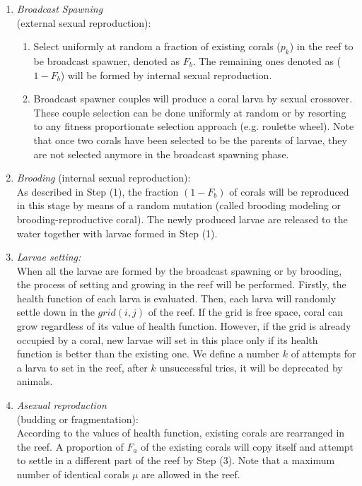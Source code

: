 \documentclass[11pt,twoside]{article}
\begin{document}
\begin{multicols}{2}
\begin{enumerate}
\item[(1)]\textit{Broadcast Spawning} \\(external sexual reproduction):
\begin{enumerate}

\item[1.a.] Select uniformly at random a fraction of existing corals ($p_k$) in the reef to be broadcast spawner, denoted as $F_b$. The remaining ones denoted as ($1 - F_b$) will be formed by internal sexual reproduction.

\item[1.b.] Broadcast spawner couples will produce a coral larva by sexual crossover. These couple selection can be done uniformly at random or by resorting to any fitness proportionate selection approach (e.g. roulette wheel). Note that once two corals have been selected to be the parents of larvae, they are not selected anymore in the broadcast spawning phase.
\end{enumerate}

\item[(2)] \textit{Brooding} (internal sexual reproduction): \\
As described in Step (1), the fraction $(1 - F_{b})$ of corals will be reproduced in this stage by means of a random mutation (called brooding modeling or brooding-reproductive coral). The newly produced larvae are released to the water together with larvae formed in Step (1).

\item[(3)] \textit{Larvae setting:} \\
When all the larvae are formed by the broadcast spawning or by brooding, the process of setting and growing in the reef will be performed. Firstly, the health function of each larva is evaluated. Then, each larva will randomly settle down in the $grid (i,j)$ of the reef. If the grid is free space, coral can grow regardless of its value of health function. However, if the grid is already occupied by a coral, new larvae will set in this place only if its health function is better than the existing one. We define a number $k$ of attempts for a larva to set in the reef, after $k$ unsuccessful tries, it will be deprecated by animals.

\item[(4)] \textit{Asexual reproduction}\\ (budding or fragmentation): \\
According to the values of health function, existing corals are rearranged in the reef. A proportion of $F_a$ of the existing corals will copy itself and attempt to settle in a different part of the reef by Step (3). Note that a maximum number of identical corals $\mu$ are allowed in the reef.


\end{enumerate}
\end{multicols}
\end{document}

